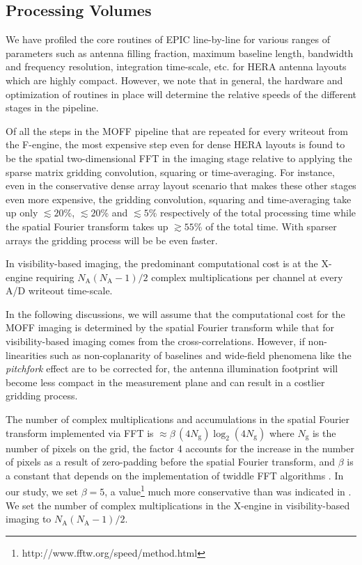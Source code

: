 \documentclass[a4paper,fleqn,usenatbib]{mnras}
\newcommand{\Nant}{N_\textrm{A}}
\newcommand{\Ngrid}{N_\textrm{g}}
\begin{document}
\subsection{Processing Volumes}

We have profiled the core routines of EPIC line-by-line for various ranges of parameters such as antenna filling fraction, maximum baseline length, bandwidth and frequency resolution, integration time-scale, etc. for HERA antenna layouts which are highly compact. However, we note that in general, the hardware and optimization of routines in place will determine the relative speeds of the different stages in the pipeline. 

Of all the steps in the MOFF pipeline that are repeated for every writeout from the F-engine, the most expensive step even for dense HERA layouts is found to be the spatial two-dimensional FFT in the imaging stage relative to applying the sparse matrix gridding convolution, squaring or time-averaging. For instance, even in the conservative dense array layout scenario that makes these other stages even more expensive, the gridding convolution, squaring and time-averaging take up only $\lesssim 20$\%, $\lesssim 20$\% and $\lesssim 5$\% respectively of the total processing time while the spatial Fourier transform takes up $\gtrsim 55$\% of the total time. With sparser arrays the gridding process will be be even faster. 

In visibility-based imaging, the predominant computational cost is at the X-engine requiring $\Nant(\Nant-1)/2$ complex multiplications per channel at every A/D writeout time-scale. 

In the following discussions, we will assume that the computational cost for the MOFF imaging is determined by the spatial Fourier transform while that for visibility-based imaging comes from the cross-correlations. However, if non-linearities such as non-coplanarity of baselines \citep{cor08} and wide-field phenomena like the {\it pitchfork} effect \citep{thy15a,thy15b} are to be corrected for, the antenna illumination footprint will become less compact in the measurement plane and can result in a costlier gridding process.

The number of complex multiplications and accumulations in the spatial Fourier transform implemented via FFT is $\approx \beta\,(4\Ngrid)\log_2(4\Ngrid)$ where $\Ngrid$ is the number of pixels on the grid, the factor 4 accounts for the increase in the number of pixels as a result of zero-padding before the spatial Fourier transform, and $\beta$ is a constant that depends on the implementation of twiddle FFT algorithms \citep{bri74}. In our study, we set $\beta=5$, a value\footnote{http://www.fftw.org/speed/method.html} much more conservative than was indicated in \citet{mor11}. We set the number of complex multiplications in the X-engine in visibility-based imaging to $\Nant(\Nant-1)/2$.
\end{document}

